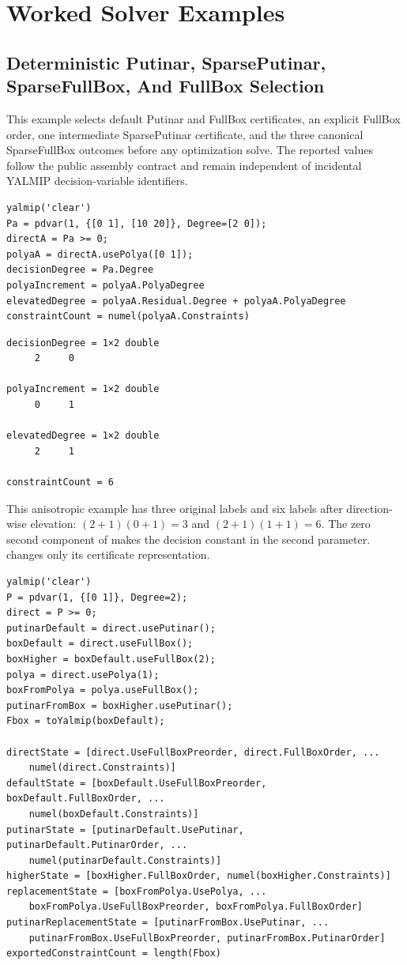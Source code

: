 \chapter{Worked Solver Examples}
\label{sec:examples}

\section{Deterministic Putinar, SparsePutinar, SparseFullBox, And FullBox Selection}
\label{sec:full-box-example}

This example selects default Putinar and FullBox certificates, an explicit FullBox order, one intermediate SparsePutinar certificate, and the three canonical SparseFullBox outcomes before any optimization solve. The reported values follow the public assembly contract and remain independent of incidental YALMIP decision-variable identifiers.

\begin{lstlisting}[style=dpmatlab]
yalmip('clear')
Pa = pdvar(1, {[0 1], [10 20]}, Degree=[2 0]);
directA = Pa >= 0;
polyaA = directA.usePolya([0 1]);
decisionDegree = Pa.Degree
polyaIncrement = polyaA.PolyaDegree
elevatedDegree = polyaA.Residual.Degree + polyaA.PolyaDegree
constraintCount = numel(polyaA.Constraints)
\end{lstlisting}

\begin{lstlisting}[style=dpoutput]
decisionDegree = 1×2 double
     2     0

polyaIncrement = 1×2 double
     0     1

elevatedDegree = 1×2 double
     2     1

constraintCount = 6
\end{lstlisting}

This anisotropic example has three original labels and six labels after direction-wise elevation: $(2+1)(0+1)=3$ and $(2+1)(1+1)=6$. The zero second component of  makes the decision constant in the second parameter.  changes only its certificate representation.

\begin{lstlisting}[style=dpmatlab]
yalmip('clear')
P = pdvar(1, {[0 1]}, Degree=2);
direct = P >= 0;
putinarDefault = direct.usePutinar();
boxDefault = direct.useFullBox();
boxHigher = boxDefault.useFullBox(2);
polya = direct.usePolya(1);
boxFromPolya = polya.useFullBox();
putinarFromBox = boxHigher.usePutinar();
Fbox = toYalmip(boxDefault);

directState = [direct.UseFullBoxPreorder, direct.FullBoxOrder, ...
    numel(direct.Constraints)]
defaultState = [boxDefault.UseFullBoxPreorder, boxDefault.FullBoxOrder, ...
    numel(boxDefault.Constraints)]
putinarState = [putinarDefault.UsePutinar, putinarDefault.PutinarOrder, ...
    numel(putinarDefault.Constraints)]
higherState = [boxHigher.FullBoxOrder, numel(boxHigher.Constraints)]
replacementState = [boxFromPolya.UsePolya, ...
    boxFromPolya.UseFullBoxPreorder, boxFromPolya.FullBoxOrder]
putinarReplacementState = [putinarFromBox.UsePutinar, ...
    putinarFromBox.UseFullBoxPreorder, putinarFromBox.PutinarOrder]
exportedConstraintCount = length(Fbox)
\end{lstlisting}


